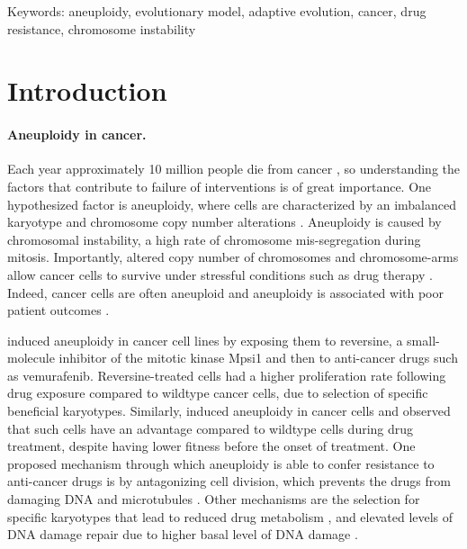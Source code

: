 \documentclass[12pt]{extarticle}
\begin{document}
Keywords: aneuploidy, evolutionary model, adaptive evolution, cancer, drug resistance, chromosome instability

\newpage
\section*{Introduction}


\paragraph{Aneuploidy in cancer.}  Each year approximately 10 million people die from cancer \citep{kocarnik2022cancer}, so understanding the factors that contribute to failure of interventions is of great importance. One hypothesized factor is aneuploidy, where cells are characterized by an imbalanced karyotype and chromosome copy number alterations \citep{schukken2018cin}. Aneuploidy is caused by chromosomal instability, a high rate of chromosome mis-segregation during mitosis. Importantly, altered  copy number of chromosomes and chromosome-arms allow cancer cells to survive under stressful conditions such as drug therapy \citep{lukow2021chromosomal,rutledge2016selective,ippolito2021gene}. Indeed, cancer cells are often aneuploid and aneuploidy is associated with poor patient outcomes \citep{ben2020context,smith2018systematic}. 

 \citet{ippolito2021gene} induced aneuploidy in cancer cell lines by exposing them to reversine, a small-molecule inhibitor of the mitotic kinase Mpsi1 and then to anti-cancer drugs such as vemurafenib. Reversine-treated cells had a higher proliferation rate following drug exposure compared to wildtype cancer cells, due to selection of specific beneficial karyotypes.
Similarly, \citet{lukow2021chromosomal} induced aneuploidy in cancer cells and observed that such cells have an advantage compared to wildtype cells during drug treatment, despite having lower fitness before the onset of treatment.
One proposed mechanism through which aneuploidy is able to confer resistance to anti-cancer drugs is by antagonizing cell division, which prevents the drugs from damaging DNA and microtubules \citep{replogle2020aneuploidy}. Other mechanisms are the selection for specific karyotypes that lead to reduced drug metabolism \citep{ippolito2021gene}, and elevated levels of DNA damage repair due to higher basal level of DNA damage \citep{zerbib2023human}.
 
\end{document}
